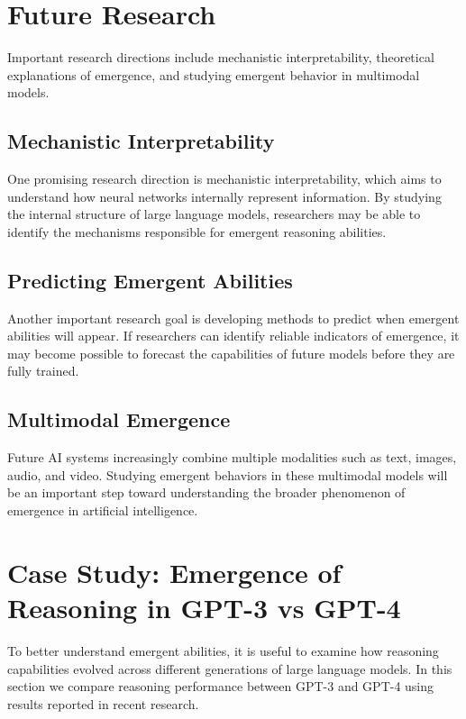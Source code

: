 \documentclass[conference]{IEEEtran}
\begin{document}
\section{Future Research}

Important research directions include mechanistic interpretability, theoretical explanations of emergence, and studying emergent behavior in multimodal models.
\subsection{Mechanistic Interpretability}

One promising research direction is mechanistic interpretability, which aims to understand how neural networks internally represent information. By studying the internal structure of large language models, researchers may be able to identify the mechanisms responsible for emergent reasoning abilities.

\subsection{Predicting Emergent Abilities}

Another important research goal is developing methods to predict when emergent abilities will appear. If researchers can identify reliable indicators of emergence, it may become possible to forecast the capabilities of future models before they are fully trained.

\subsection{Multimodal Emergence}

Future AI systems increasingly combine multiple modalities such as text, images, audio, and video. Studying emergent behaviors in these multimodal models will be an important step toward understanding the broader phenomenon of emergence in artificial intelligence.

\section{Case Study: Emergence of Reasoning in GPT-3 vs GPT-4}

To better understand emergent abilities, it is useful to examine how reasoning capabilities evolved across different generations of large language models. In this section we compare reasoning performance between GPT-3 and GPT-4 using results reported in recent research.
\end{document}
